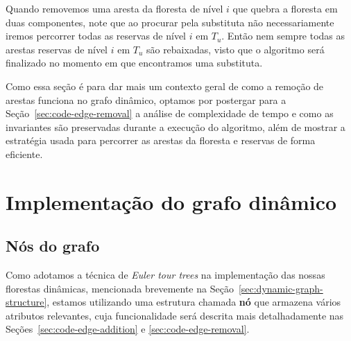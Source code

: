 Quando removemos uma aresta da floresta de nível $i$ que quebra a floresta em duas componentes, note que ao procurar pela substituta não necessariamente iremos percorrer todas as reservas de nível $i$ em $T_u$. Então nem sempre todas as arestas reservas de nível $i$ em $T_u$ são rebaixadas, visto que o algoritmo será finalizado no momento em que encontramos uma substituta.

Como essa seção é para dar mais um contexto geral de como a remoção de arestas funciona no grafo dinâmico, optamos por postergar para a Seção~\ref{sec:code-edge-removal} a análise de complexidade de tempo e como as invariantes são preservadas durante a execução do algoritmo, além de mostrar a estratégia usada para percorrer as arestas da floresta e reservas de forma eficiente.  








































\newpage

\section{Implementação do grafo dinâmico}
\label{sec:dynamic-graph-implementation}

\subsection{Nós do grafo}
\label{sec:graph-nodes}

Como adotamos a técnica de \textit{Euler tour trees} na implementação das nossas florestas dinâmicas, mencionada brevemente na Seção~\ref{sec:dynamic-graph-structure}, estamos utilizando uma estrutura chamada \textbf{nó} que armazena vários atributos relevantes, cuja funcionalidade será descrita mais detalhadamente nas Seções~\ref{sec:code-edge-addition} e \ref{sec:code-edge-removal}. 

